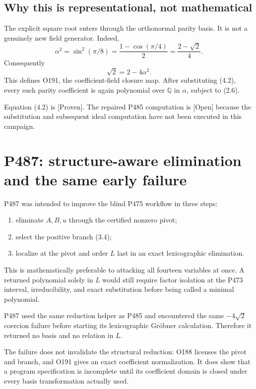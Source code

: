 \documentclass[11pt,a4paper,openany]{report}
\newcommand{\Q}{\mathbb Q}
\newcommand{\statusProven}{\textcolor{fingreen}{[Proven]}}
\newcommand{\statusOpen}{\textcolor{finorange}{[Open]}}
\begin{document}
\section{Why this is representational, not mathematical}

The explicit square root enters through the orthonormal parity basis. It is
not a genuinely new field generator. Indeed,
\[
 \alpha^2=\sin^2(\pi/8)
 =\frac{1-\cos(\pi/4)}2
 =\frac{2-\sqrt2}{4}.
\]
Consequently
\[
 \boxed{\sqrt2=2-4\alpha^2}.                                      \tag{4.2}
\]
This defines O191, the coefficient-field closure map. After substituting
(4.2), every such parity coefficient is again polynomial over \(\Q\) in
\(\alpha\), subject to (2.6).

Equation (4.2) is \statusProven{}. The repaired P485 computation is
\statusOpen{} because the substitution and subsequent ideal computation have
not been executed in this campaign.

\chapter{P487: structure-aware elimination and the same early failure}

P487 was intended to improve the blind P475 workflow in three steps:
\begin{enumerate}
\item eliminate \(A,B,u\) through the certified nonzero pivot;
\item select the positive branch (3.4);
\item localize at the pivot and order \(L\) last in an exact lexicographic
elimination.
\end{enumerate}
This is mathematically preferable to attacking all fourteen variables at
once. A returned polynomial solely in \(L\) would still require factor
isolation at the P473 interval, irreducibility, and exact substitution before
being called a minimal polynomial.

P487 used the same reduction helper as P485 and encountered the same
\(-4\sqrt2\) coercion failure before starting its lexicographic Gröbner
calculation. Therefore it returned no basis and no relation in \(L\).

The failure does not invalidate the structural reduction: O188 licenses the
pivot and branch, and O191 gives an exact coefficient normalization. It does
show that a program specification is incomplete until its coefficient domain
is closed under every basis transformation actually used.
\end{document}
